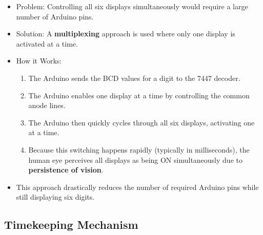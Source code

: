 \documentclass[journal]{IEEEtran}
\begin{document}
\begin{itemize}
    \item Problem: Controlling all six displays simultaneously would require a large number of Arduino pins.
    \item Solution: A \textbf{multiplexing} approach is used where only one display is activated at a time.
    \item How it Works:
    \begin{enumerate}
        \item The Arduino sends the BCD values for a digit to the 7447 decoder.
        \item The Arduino enables one display at a time by controlling the common anode lines.
        \item The Arduino then quickly cycles through all six displays, activating one at a time.
        \item Because this switching happens rapidly (typically in milliseconds), the human eye perceives all displays as being ON simultaneously due to \textbf{persistence of vision}.
    \end{enumerate}
    \item This approach drastically reduces the number of required Arduino pins while still displaying six digits.
\end{itemize}

\subsection{Timekeeping Mechanism}
\end{document}
